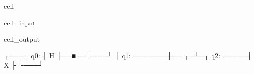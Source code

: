 \documentclass[letterpaper,10pt,english]{jupyterBook}
\begin{document}
\begin{sphinxuseclass}{cell}\begin{sphinxVerbatimInput}

\begin{sphinxuseclass}{cell_input}
\begin{sphinxVerbatim}[commandchars=\\\{\}]
\end{sphinxVerbatim}

\end{sphinxuseclass}\end{sphinxVerbatimInput}
\begin{sphinxVerbatimOutput}

\begin{sphinxuseclass}{cell_output}
\begin{sphinxVerbatim}[commandchars=\\\{\}]
     ┌───┐
q\PYGZus{}0: ┤ H ├──■──
     └───┘  │
q\PYGZus{}1: ───────┼──
          ┌─┴─┐
q\PYGZus{}2: ─────┤ X ├
          └───┘
\end{sphinxVerbatim}

\end{sphinxuseclass}\end{sphinxVerbatimOutput}

\end{sphinxuseclass}
\end{document}
